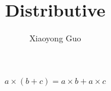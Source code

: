 \documentclass{beamer}
\title{Distributive}
\author{Xiaoyong Guo}
\begin{document}
\frame{\titlepage}

\begin{frame}
\begin{equation}
a \times (b+c) = a\times b + a\times c
\end{equation}
\end{frame}
\end{document}

